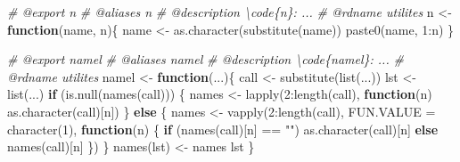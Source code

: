 \documentclass[
]{article}
\newenvironment{Shaded}{\begin{snugshade}}{\end{snugshade}}
\newcommand{\AttributeTok}[1]{\textcolor[rgb]{0.77,0.63,0.00}{#1}}
\newcommand{\CommentTok}[1]{\textcolor[rgb]{0.56,0.35,0.01}{\textit{#1}}}
\newcommand{\ControlFlowTok}[1]{\textcolor[rgb]{0.13,0.29,0.53}{\textbf{#1}}}
\newcommand{\DecValTok}[1]{\textcolor[rgb]{0.00,0.00,0.81}{#1}}
\newcommand{\FunctionTok}[1]{\textcolor[rgb]{0.00,0.00,0.00}{#1}}
\newcommand{\NormalTok}[1]{#1}
\newcommand{\OtherTok}[1]{\textcolor[rgb]{0.56,0.35,0.01}{#1}}
\newcommand{\SpecialCharTok}[1]{\textcolor[rgb]{0.00,0.00,0.00}{#1}}
\newcommand{\StringTok}[1]{\textcolor[rgb]{0.31,0.60,0.02}{#1}}
\begin{document}
\begin{Shaded}
\begin{Highlighting}[]
\CommentTok{\#\textquotesingle{} @export n}
\CommentTok{\#\textquotesingle{} @aliases n}
\CommentTok{\#\textquotesingle{} @description \textbackslash{}code\{n\}: ...}
\CommentTok{\#\textquotesingle{} @rdname utilites}
\NormalTok{n }\OtherTok{\textless{}{-}} \ControlFlowTok{function}\NormalTok{(name, n)\{}
\NormalTok{  name }\OtherTok{\textless{}{-}} \FunctionTok{as.character}\NormalTok{(}\FunctionTok{substitute}\NormalTok{(name))}
  \FunctionTok{paste0}\NormalTok{(name, }\DecValTok{1}\SpecialCharTok{:}\NormalTok{n)}
\NormalTok{\}}

\CommentTok{\#\textquotesingle{} @export namel}
\CommentTok{\#\textquotesingle{} @aliases namel}
\CommentTok{\#\textquotesingle{} @description \textbackslash{}code\{namel\}: ...}
\CommentTok{\#\textquotesingle{} @rdname utilites}
\NormalTok{namel }\OtherTok{\textless{}{-}} \ControlFlowTok{function}\NormalTok{(...)\{}
\NormalTok{  call }\OtherTok{\textless{}{-}} \FunctionTok{substitute}\NormalTok{(}\FunctionTok{list}\NormalTok{(...))}
\NormalTok{  lst }\OtherTok{\textless{}{-}} \FunctionTok{list}\NormalTok{(...)}
  \ControlFlowTok{if}\NormalTok{ (}\FunctionTok{is.null}\NormalTok{(}\FunctionTok{names}\NormalTok{(call))) \{}
\NormalTok{    names }\OtherTok{\textless{}{-}} \FunctionTok{lapply}\NormalTok{(}\DecValTok{2}\SpecialCharTok{:}\FunctionTok{length}\NormalTok{(call), }\ControlFlowTok{function}\NormalTok{(n) }\FunctionTok{as.character}\NormalTok{(call)[n])}
\NormalTok{  \} }\ControlFlowTok{else}\NormalTok{ \{}
\NormalTok{    names }\OtherTok{\textless{}{-}} \FunctionTok{vapply}\NormalTok{(}\DecValTok{2}\SpecialCharTok{:}\FunctionTok{length}\NormalTok{(call), }\AttributeTok{FUN.VALUE =} \FunctionTok{character}\NormalTok{(}\DecValTok{1}\NormalTok{),}
      \ControlFlowTok{function}\NormalTok{(n) \{}
        \ControlFlowTok{if}\NormalTok{ (}\FunctionTok{names}\NormalTok{(call)[n] }\SpecialCharTok{==} \StringTok{""}\NormalTok{)}
          \FunctionTok{as.character}\NormalTok{(call)[n]}
        \ControlFlowTok{else}
          \FunctionTok{names}\NormalTok{(call)[n]}
\NormalTok{      \})}
\NormalTok{  \}}
  \FunctionTok{names}\NormalTok{(lst) }\OtherTok{\textless{}{-}}\NormalTok{ names}
\NormalTok{  lst}
\NormalTok{\}}


\end{Highlighting}
\end{Shaded}
\end{document}
